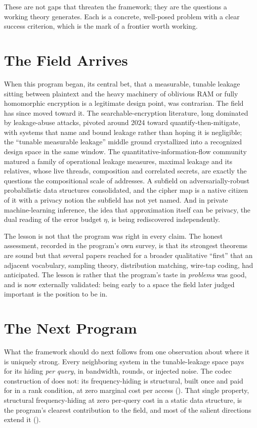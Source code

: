 These are not gaps that threaten the framework; they are the questions a
working theory generates. Each is a concrete, well-posed problem with a clear
success criterion, which is the mark of a frontier worth working.

\section{The Field Arrives}
\label{sec:field-arrives}

When this program began, its central bet, that a measurable, tunable leakage
sitting between plaintext and the heavy machinery of oblivious RAM or fully
homomorphic encryption is a legitimate design point, was contrarian. The
field has since moved toward it. The searchable-encryption literature, long
dominated by leakage-abuse attacks, pivoted around 2024 toward
quantify-then-mitigate, with systems that name and bound leakage rather than
hoping it is negligible; the ``tunable measurable leakage'' middle ground
crystallized into a recognized design space in the same window. The
quantitative-information-flow community matured a family of operational
leakage measures, maximal leakage and its relatives, whose live threads,
composition and correlated secrets, are exactly the questions the
compositional scale of  addresses. A subfield on
adversarially-robust probabilistic data structures consolidated, and the
cipher map is a native citizen of it with a privacy notion the subfield has
not yet named. And in private machine-learning inference, the idea that
approximation itself can be privacy, the dual reading of the error budget
$\eta$, is being rediscovered independently.

The lesson is not that the program was right in every claim. The honest
assessment, recorded in the program's own survey, is that its strongest
theorems are sound but that several papers reached for a broader qualitative
``first'' that an adjacent vocabulary, sampling theory, distribution
matching, wire-tap coding, had anticipated. The lesson is rather that the
program's taste in \emph{problems} was good, and is now externally
validated: being early to a space the field later judged important is the
position to be in.

\section{The Next Program}
\label{sec:next-program}

What the framework should do next follows from one observation about where it
is uniquely strong. Every neighboring system in the tunable-leakage space
pays for its hiding \emph{per query}, in bandwidth, rounds, or injected
noise. The codec construction of  does not: its
frequency-hiding is structural, built once and paid for in a rank condition,
at zero marginal cost per access (). That single property,
structural frequency-hiding at zero per-query cost in a static data
structure, is the program's clearest contribution to the field, and most of
the salient directions extend it ().

